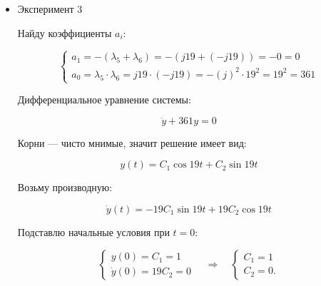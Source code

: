 \documentclass[a4paper,12pt]{article}
\begin{document}
\begin{itemize}
		Возьму производную:
		
		\[
		\dot{y}(t) = e^{-2.9 t} \left[ (C_1 \cos 7 t + C_2 \sin 7 t)(-2.9) + (-7 C_1 \sin 7 t + 7 C_2 \cos 7 t) \right]
		\]
		
		
		Подставлю начальные условия при \(t=0\):
		
		\[
		\begin{cases}
			y(0) = C_1 = 1 \\[8pt]
			\dot{y}(0) = -2.9 \cdot C_1 + 7 \cdot C_2 = 0
		\end{cases}
		\quad \Rightarrow \quad
		\begin{cases}
			C_1 = 1 \\[8pt]
			C_2 = \dfrac{29}{70}
		\end{cases}
		\]
		
		
		
		Итоговое решение:
		
		\[
			y(t) = e^{-2.9 t} \left( \cos 7 t + \frac{29}{70} \sin 7 t \right)
		\]
		
		\item Эксперимент 3
		
		Найду коэффициенты \(a_i\):
		
		\[
		\begin{cases}
			a_1 = -(\lambda_5 + \lambda_6) = -(j19 + (-j19)) = -0 = 0 \\[8pt]
			a_0 = \lambda_5 \cdot \lambda_6 = j19 \cdot (-j19) = -(j)^2 \cdot 19^2 = 19^2 = 361
		\end{cases}
		\]
		
		Дифференциальное уравнение системы:

		\[
		\ddot{y} + 361 y = 0
		\]
		
		Корни — чисто мнимые, значит решение имеет вид:
		
		\[
		y(t) = C_1 \cos 19 t + C_2 \sin 19 t
		\]
		
		Возьму производную:
		
		\[
		\dot{y}(t) = -19 C_1 \sin 19 t + 19 C_2 \cos 19 t
		\]
		
		Подставлю начальные условия при \(t=0\):
		
		\[
		\begin{cases}
			y(0) = C_1 = 1 \\[8pt]
			\dot{y}(0) = 19 C_2 = 0
		\end{cases}
		\quad \Rightarrow \quad
		\begin{cases}
			C_1 = 1 \\[8pt]
			C_2 = 0.
		\end{cases}
		\]
		

\end{itemize}
\end{document}
